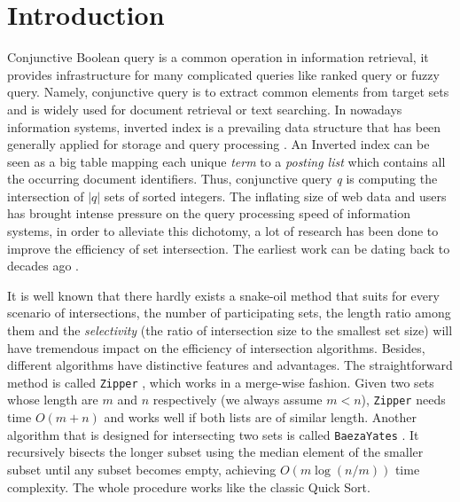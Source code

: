 \documentclass[runningheads,a4paper]{llncs}
\begin{document}
\section{Introduction}\label{sec:introduction}
Conjunctive Boolean query is a common operation in information retrieval, it provides infrastructure for many complicated queries like ranked query or fuzzy query.
Namely, conjunctive query is to extract common elements from target sets and is widely used for document retrieval or text searching.
In nowadays information systems, inverted index is a prevailing data structure that has been generally applied for storage and query processing \cite{culpepper2010efficient,zobel2006inverted}.
An Inverted index can be seen as a big table mapping each unique \textit{term} to a \textit{posting list} which contains all the occurring document identifiers.
Thus, conjunctive query \textit{q} is computing the intersection of $ |q| $ sets of sorted integers.
The inflating size of web data and users has brought intense pressure on the query processing speed of information systems, in order to alleviate this dichotomy, a lot of research has been done to improve the efficiency of set intersection.
The earliest work can be dating back to decades ago \cite{Hwang1971Optimal,Hwang1972A}.

It is well known that there hardly exists a snake-oil method that suits for every scenario of intersections, the number of participating sets, the length ratio among them and the \textit{selectivity} (the ratio of intersection size to the smallest set size) will have tremendous impact on the efficiency of intersection algorithms.
Besides, different algorithms have distinctive features and advantages.
The straightforward method is called \texttt{Zipper} \cite{Sanders2007Intersection}, which works in a merge-wise fashion.
Given two sets whose length are $ m $ and $ n $ respectively (we always assume $ m<n $), \texttt{Zipper} needs time $ O( m + n ) $ and works well if both lists are of similar length.
Another algorithm that is designed for intersecting two sets is called \texttt{BaezaYates} \cite{Baeza2010Fast,Baezayates2004A,Baezayates2005Experimental}.
It recursively bisects the longer subset using the median element of the smaller subset until any subset becomes empty, achieving $ O(m\log (n/m)) $ time complexity.
The whole procedure works like the classic Quick Sort.
\end{document}
